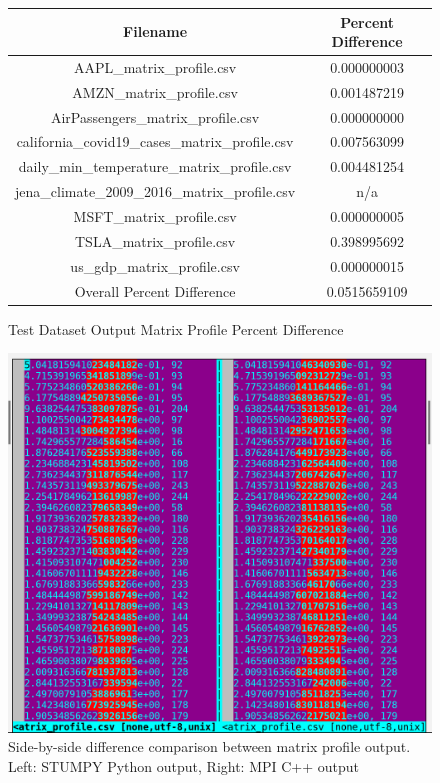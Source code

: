 \documentclass[conference]{IEEEtran}
\begin{document}
\begin{figure}
\caption{Test Dataset Output Matrix Profile Percent Difference}
\begin{tabular}{|c|c|}
\hline
\textbf{Filename} & \textbf{Percent Difference} \\ \hline \hline
AAPL\_matrix\_profile.csv & 0.000000003 \\ \hline
AMZN\_matrix\_profile.csv & 0.001487219 \\ \hline
AirPassengers\_matrix\_profile.csv & 0.000000000 \\ \hline
california\_covid19\_cases\_matrix\_profile.csv & 0.007563099 \\ \hline
daily\_min\_temperature\_matrix\_profile.csv & 0.004481254 \\ \hline
jena\_climate\_2009\_2016\_matrix\_profile.csv & n/a \\ \hline
MSFT\_matrix\_profile.csv & 0.000000005 \\ \hline
TSLA\_matrix\_profile.csv & 0.398995692 \\ \hline
us\_gdp\_matrix\_profile.csv & 0.000000015 \\ \hline \hline
Overall Percent Difference & 0.0515659109 \\ \hline
\hline
\end{tabular}
\label{fig:Matrix_Profile_Percent_Difference}
\end{figure}

\begin{figure}
\begin{center}
\includegraphics[scale=0.45]{matrix_profile_diff.png}
\caption{Side-by-side difference comparison between matrix profile output.   Left: STUMPY Python output, Right: MPI C++ output}
\label{fig:Matrix_Profile_Diff}
\end{center}
\end{figure}
\end{document}
